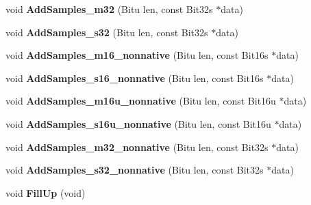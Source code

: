 \begin{DoxyCompactItemize}
\item 
\hypertarget{classMixerChannel_a8f6f70528e13e637403e8fc368867c97}{void {\bfseries Add\-Samples\-\_\-m32} (Bitu len, const Bit32s $\ast$data)}\label{classMixerChannel_a8f6f70528e13e637403e8fc368867c97}

\item 
\hypertarget{classMixerChannel_a2eec58265bd8e3f3996468a73e80e19f}{void {\bfseries Add\-Samples\-\_\-s32} (Bitu len, const Bit32s $\ast$data)}\label{classMixerChannel_a2eec58265bd8e3f3996468a73e80e19f}

\item 
\hypertarget{classMixerChannel_a10a0164e8e238c967190e9536c2b71cc}{void {\bfseries Add\-Samples\-\_\-m16\-\_\-nonnative} (Bitu len, const Bit16s $\ast$data)}\label{classMixerChannel_a10a0164e8e238c967190e9536c2b71cc}

\item 
\hypertarget{classMixerChannel_a1ce7497712bc86d40a16865993636bd8}{void {\bfseries Add\-Samples\-\_\-s16\-\_\-nonnative} (Bitu len, const Bit16s $\ast$data)}\label{classMixerChannel_a1ce7497712bc86d40a16865993636bd8}

\item 
\hypertarget{classMixerChannel_ab7074c96bd7c25d9ca33509c944faa61}{void {\bfseries Add\-Samples\-\_\-m16u\-\_\-nonnative} (Bitu len, const Bit16u $\ast$data)}\label{classMixerChannel_ab7074c96bd7c25d9ca33509c944faa61}

\item 
\hypertarget{classMixerChannel_ab638e9ff862c19e43b82218879854cb0}{void {\bfseries Add\-Samples\-\_\-s16u\-\_\-nonnative} (Bitu len, const Bit16u $\ast$data)}\label{classMixerChannel_ab638e9ff862c19e43b82218879854cb0}

\item 
\hypertarget{classMixerChannel_ab590ebd5d99f20882b4e013932f46284}{void {\bfseries Add\-Samples\-\_\-m32\-\_\-nonnative} (Bitu len, const Bit32s $\ast$data)}\label{classMixerChannel_ab590ebd5d99f20882b4e013932f46284}

\item 
\hypertarget{classMixerChannel_a9283464a784a81c0548c45d9c5375b32}{void {\bfseries Add\-Samples\-\_\-s32\-\_\-nonnative} (Bitu len, const Bit32s $\ast$data)}\label{classMixerChannel_a9283464a784a81c0548c45d9c5375b32}

\item 
\hypertarget{classMixerChannel_ade749a4f846a0f69c223f541e761cefe}{void {\bfseries Fill\-Up} (void)}\label{classMixerChannel_ade749a4f846a0f69c223f541e761cefe}


\end{DoxyCompactItemize}
